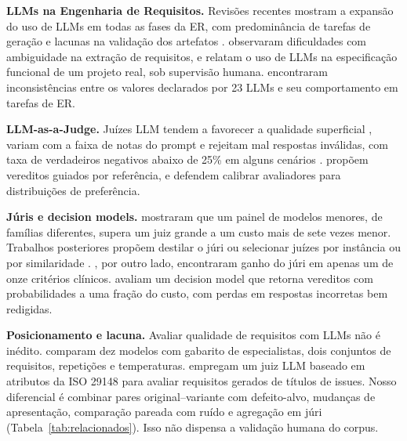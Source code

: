 \documentclass[12pt]{article}
\begin{document}
\textbf{LLMs na Engenharia de Requisitos.} Revisões recentes mostram a expansão do uso de LLMs em todas as fases da ER, com predominância de tarefas de geração e lacunas na validação dos artefatos \citep{marques2024,silva2025}. \citet{almeida2025} observaram dificuldades com ambiguidade na extração de requisitos, e \citet{pasquale2025} relatam o uso de LLMs na especificação funcional de um projeto real, sob supervisão humana. \citet{yamani2025} encontraram inconsistências entre os valores declarados por 23 LLMs e seu comportamento em tarefas de ER.

\textbf{LLM-as-a-Judge.} Juízes LLM tendem a favorecer a qualidade superficial \citep{zhou2024}, variam com a faixa de notas do prompt \citep{fujinuma2025} e rejeitam mal respostas inválidas, com taxa de verdadeiros negativos abaixo de 25\% em alguns cenários \citep{jain2025}. \citet{badshah2024} propõem vereditos guiados por referência, e \citet{li2025confidence} defendem calibrar avaliadores para distribuições de preferência.

\textbf{Júris e decision models.} \citet{verga2024} mostraram que um painel de modelos menores, de famílias diferentes, supera um juiz grande a um custo mais de sete vezes menor. Trabalhos posteriores propõem destilar o júri \citep{tang2025} ou selecionar juízes por instância \citep{li2025jury} ou por similaridade \citep{yang2025}. \citet{williams2025}, por outro lado, encontraram ganho do júri em apenas um de onze critérios clínicos. \citet{li2026jev} avaliam um decision model que retorna vereditos com probabilidades a uma fração do custo, com perdas em respostas incorretas bem redigidas.

\textbf{Posicionamento e lacuna.} Avaliar qualidade de requisitos com LLMs não é inédito. \citet{shefa2026} comparam dez modelos com gabarito de especialistas, dois conjuntos de requisitos, repetições e temperaturas. \citet{paiva2026} empregam um juiz LLM baseado em atributos da ISO 29148 para avaliar requisitos gerados de títulos de issues. Nosso diferencial é combinar pares original--variante com defeito-alvo, mudanças de apresentação, comparação pareada com ruído e agregação em júri (Tabela~\ref{tab:relacionados}). Isso não dispensa a validação humana do corpus.
\end{document}
